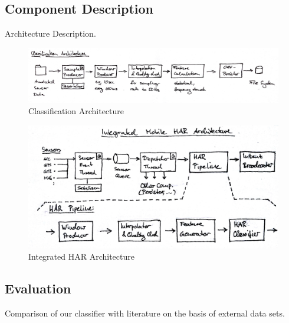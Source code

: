 \subsection{Component Description}

Architecture Description.

\begin{figure}[htbp]
\centering
\includegraphics[width=\textwidth]{img/har/classification_architecture.jpg}
\caption{Classification Architecture}\label{fig:classification_architecture}
\end{figure}

\begin{figure}[htbp]
\centering
\includegraphics[width=\textwidth]{img/har/integration.jpg}
\caption{Integrated HAR Architecture}\label{fig:integrated_har}
\end{figure}



\subsection{Evaluation}

Comparison of our classifier with literature on the basis of external
data sets.


